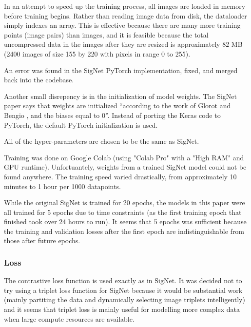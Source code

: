 In an attempt to speed up the training process, all images are loaded in memory before training begins.
Rather than reading image data from disk, the dataloader simply indexes an array.
This is effective because there are many more training points (image pairs) than images, and it is feasible because the total uncompressed data in the images after they are resized is approximately 82 MB (2400 images of size 155 by 220 with pixels in range 0 to 255).

An error was found in the SigNet PyTorch implementation, fixed, and merged back into the codebase.

Another small disrepency is in the initialization of model weights.
The SigNet paper says that weights are initialized ``according to the work
of Glorot and Bengio \cite{glorot_bengio}, and the biases equal to 0''\cite{sig_net}.
Instead of porting the Keras code to PyTorch, the default PyTorch initialization is used.

All of the hyper-parameters are chosen to be the same as SigNet.

Training was done on Google Colab (using "Colab Pro" with a "High RAM" and GPU runtime).
Unfortuantely, weights from a trained SigNet model could not be found anywhere.
The training speed varied drastically, from approximately 10 minutes to 1 hour per 1000 datapoints.

While the original SigNet is trained for 20 epochs, the models in this paper were all trained for 5 epochs due to time constraints (as the first training epoch that finished took over 24 hours to run).
It seems that 5 epochs was sufficient because the training and validation losses after the first epoch are indistinguishable from those after future epochs.


\subsubsection{Loss}
The contrastive loss function is used exactly as in SigNet\cite{GitHub_sounakdey}.
It was decided not to try using a triplet loss function for SigNet because it would be substantial work (mainly partiting the data and dynamically selecting image triplets intelligently) and it seems that triplet loss is mainly useful for modelling more complex data when large compute resources are available.


